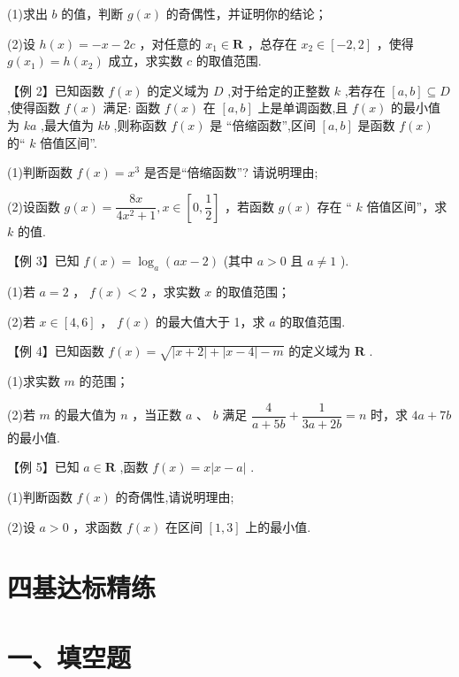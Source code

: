 (1)求出 $b$ 的值，判断 $g\left( x\right)$ 的奇偶性，并证明你的结论；

(2)设 $h\left( x\right)  =  - x - {2c}$ ，对任意的 ${x}_{1} \in  \mathbf{R}$ ，总存在 ${x}_{2} \in  \left\lbrack  {-2,2}\right\rbrack$ ，使得 $g\left( {x}_{1}\right)  = h\left( {x}_{2}\right)$ 成立，求实数 $c$ 的取值范围.

【例 2】已知函数 $f\left( x\right)$ 的定义域为 $D$ ,对于给定的正整数 $k$ ,若存在 $\left\lbrack  {a,b}\right\rbrack   \subseteq  D$ ,使得函数 $f\left( x\right)$ 满足: 函数 $f\left( x\right)$ 在 $\left\lbrack  {a,b}\right\rbrack$ 上是单调函数,且 $f\left( x\right)$ 的最小值为 ${ka}$ ,最大值为 ${kb}$ ,则称函数 $f\left( x\right)$ 是 “倍缩函数”,区间 $\left\lbrack  {a,b}\right\rbrack$ 是函数 $f\left( x\right)$ 的“ $k$ 倍值区间”.

(1)判断函数 $f\left( x\right)  = {x}^{3}$ 是否是“倍缩函数”? 请说明理由;

(2)设函数 $g\left( x\right)  = \dfrac{8x}{4{x}^{2} + 1},x \in  \left\lbrack  {0,\dfrac{1}{2}}\right\rbrack$ ，若函数 $g\left( x\right)$ 存在 “ $k$ 倍值区间”，求 $k$ 的值.


【例 3】已知 $f\left( x\right)  = {\log }_{a}\left( {{ax} - 2}\right)$ (其中 $a > 0$ 且 $a \neq  1$ ).

(1)若 $a = 2$ ， $f\left( x\right)  < 2$ ，求实数 $x$ 的取值范围；

(2)若 $x \in  \left\lbrack  {4,6}\right\rbrack$ ， $f\left( x\right)$ 的最大值大于 1，求 $a$ 的取值范围.

【例 4】已知函数 $f\left( x\right)  = \sqrt{\left| {x + 2}\right|  + \left| {x - 4}\right|  - m}$ 的定义域为 $\mathbf{R}$ .

(1)求实数 $m$ 的范围；

(2)若 $m$ 的最大值为 $n$ ，当正数 $a$ 、 $b$ 满足 $\dfrac{4}{a + {5b}} + \dfrac{1}{{3a} + {2b}} = n$ 时，求 ${4a} + {7b}$ 的最小值.

【例 5】已知 $a \in  \mathbf{R}$ ,函数 $f\left( x\right)  = x\left| {x - a}\right|$ .

(1)判断函数 $f\left( x\right)$ 的奇偶性,请说明理由;

(2)设 $a > 0$ ，求函数 $f\left( x\right)$ 在区间 $\left\lbrack  {1,3}\right\rbrack$ 上的最小值.

\section*{四基达标精练}

\section*{一、填空题}

